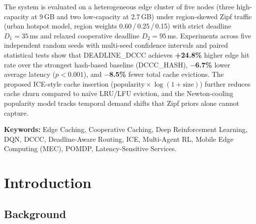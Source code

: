 \documentclass[12pt,a4paper]{report}
\begin{document}
The system is evaluated on a heterogeneous edge cluster of five nodes (three high-capacity
at 9\,GB and two low-capacity at 2.7\,GB) under region-skewed Zipf traffic (urban hotspot
model, region weights 0.60\,/\,0.25\,/\,0.15) with strict deadline $D_1 = 35$\,ms and
relaxed cooperative deadline $D_2 = 95$\,ms. Experiments across five independent random
seeds with multi-seed confidence intervals and paired statistical tests show that
DEADLINE\_DCCC achieves \textbf{+24.8\%} higher edge hit rate over the strongest
hash-based baseline (DCCC\_HASH), \textbf{$-$6.7\%} lower average latency ($p < 0.001$),
and \textbf{$-$8.5\%} fewer total cache evictions. The proposed ICE-style cache insertion
($\text{popularity} \times \log(1+\text{size})$) further reduces cache churn compared to
na\"ive LRU/LFU eviction, and the Newton-cooling popularity model tracks temporal demand
shifts that Zipf priors alone cannot capture.

\vspace{0.5cm}
\noindent\textbf{Keywords:} Edge Caching, Cooperative Caching, Deep Reinforcement
Learning, DQN, DCCC, Deadline-Aware Routing, ICE, Multi-Agent RL, Mobile Edge
Computing (MEC), POMDP, Latency-Sensitive Services.
\clearpage


\listoffigures
{}
\clearpage


\listoftables
{}
\clearpage


\tableofcontents
\clearpage




\chapter{Introduction}

\section{Background}
\end{document}
